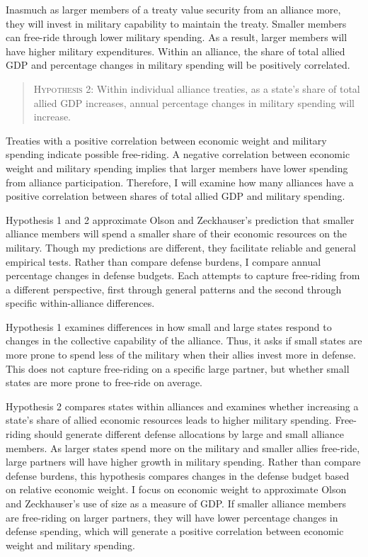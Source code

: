 \documentclass[12pt]{article}
\begin{document}
Inasmuch as larger members of a treaty value security from an alliance more, they will invest in military capability to maintain the treaty.
Smaller members can free-ride through lower military spending. 
As a result, larger members will have higher military expenditures. 
Within an alliance, the share of total allied GDP and percentage changes in military spending will be positively correlated. 


\begin{quote}
\textsc{Hypothesis 2}: Within individual alliance treaties, as a state's share of total allied GDP increases, annual percentage changes in military spending will increase. 
\end{quote}


Treaties with a positive correlation between economic weight and military spending indicate possible free-riding. 
A negative correlation between economic weight and military spending implies that larger members have lower spending from alliance participation. 
Therefore, I will examine how many alliances have a positive correlation between shares of total allied GDP and military spending.  
 

Hypothesis 1 and 2 approximate Olson and Zeckhauser's prediction that smaller alliance members will spend a smaller share of their economic resources on the military. 
Though my predictions are different, they facilitate reliable and general empirical tests.
Rather than compare defense burdens, I compare annual percentage changes in defense budgets.  
Each attempts to capture free-riding from a different perspective, first through general patterns and the second through specific within-alliance differences. 


Hypothesis 1 examines differences in how small and large states respond to changes in the collective capability of the alliance.
Thus, it asks if small states are more prone to spend less of the military when their allies invest more in defense. 
This does not capture free-riding on a specific large partner, but whether small states are more prone to free-ride on average. 


Hypothesis 2 compares states within alliances and examines whether increasing a state's share of allied economic resources leads to higher military spending. 
Free-riding should generate different defense allocations by large and small alliance members. 
As larger states spend more on the military and smaller allies free-ride, large partners will have higher growth in military spending. 
Rather than compare defense burdens, this hypothesis compares changes in the defense budget based on relative economic weight. 
I focus on economic weight to approximate Olson and Zeckhauser's use of size as a measure of GDP. 
If smaller alliance members are free-riding on larger partners, they will have lower percentage changes in defense spending, which will generate a positive correlation between economic weight and military spending.  
\end{document}
